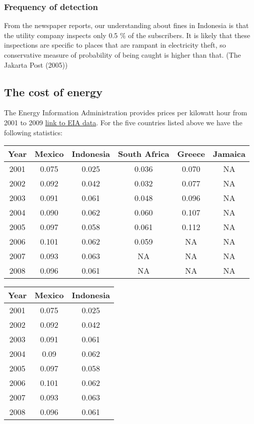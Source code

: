 \documentclass{article}
\begin{document}
\subsubsection{Frequency of detection}
From the newspaper reports, our understanding about fines in Indonesia is that the utility company inspects only 0.5 $\%$ of the subscribers. It is likely that these inspections are specific to places that are rampant in electricity theft, so conservative measure of probability of being caught is higher than that. (The Jakarta Post (2005))\\

\subsection{The cost of energy}
The Energy Information Administration provides prices per kilowatt hour from 2001 to 2009 \href{http://www.eia.gov/countries/prices/electricity_households.cfm}{ link to EIA data}. For the five countries listed above we have the following statistics: 
\begin{center}
\begin{tabular}{c|c|c|c|c|c}\centering
Year & Mexico & Indonesia & South Africa & Greece & Jamaica\\
\hline
2001 & 0.075	& 0.025 & 0.036  &  0.070 & NA \\
\hline
2002 & 0.092	& 0.042 & 0.032 &  0.077 & NA \\
\hline
2003 & 0.091	& 0.061 & 0.048 & 0.096 & NA \\
\hline
2004 & 0.090	& 0.062 & 0.060 & 0.107 & NA \\
\hline
2005 & 0.097	& 0.058 & 0.061 &  0.112 & NA \\
\hline
2006 & 0.101	& 0.062 & 0.059 & NA  & NA \\
\hline
2007 & 0.093	& 0.063 &  NA &  NA & NA \\
\hline
2008 & 0.096	& 0.061 & NA &  NA & NA \\
\hline
\end{tabular}
\end{center}

\begin{center}
\begin{tabular}[h]{c|c|c}\centering
Year & Mexico & Indonesia \\ 
\hline
2001 & 0.075	& 0.025\\
\hline
2002 & 0.092	& 0.042\\
\hline
2003 & 0.091	& 0.061\\
\hline
2004 & 0.09		& 0.062\\
\hline
2005 & 0.097	& 0.058\\
\hline
2006 & 0.101	& 0.062\\
\hline
2007 & 0.093	& 0.063\\
\hline
2008 & 0.096	& 0.061\\
\hline 
\end{tabular} 
\end{center}
\end{document}
